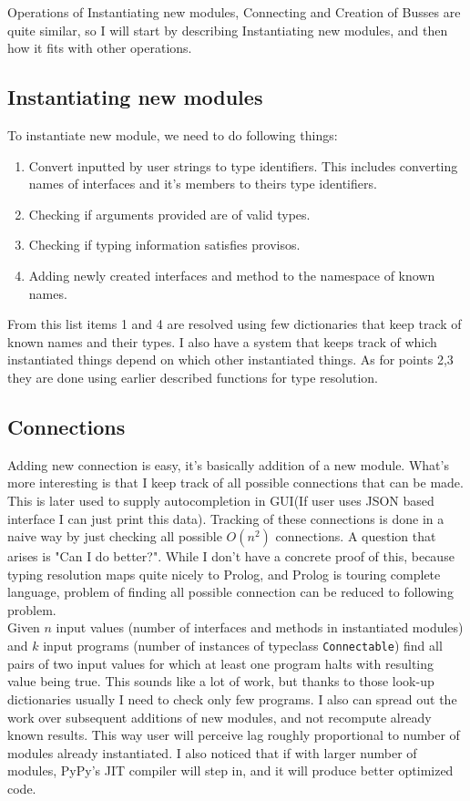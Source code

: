 \documentclass[12pt]{report}
\begin{document}
Operations of Instantiating new modules, Connecting and Creation of Busses are quite similar, so I will start by describing Instantiating new modules, and then how it fits with other operations.

\subsection{Instantiating new modules}
To instantiate new module, we need to do following things:
\begin{enumerate}
    \item Convert inputted by user strings to type identifiers. This includes converting names of interfaces and it's members to theirs type identifiers.
    \item Checking if arguments provided are of valid types.
    \item Checking if typing information satisfies provisos.
    \item Adding newly created interfaces and method to the namespace of known names.
\end{enumerate}
From this list items 1 and 4 are resolved using few dictionaries that keep track of known names and their types. I also have a system that keeps track of which instantiated things depend on which other instantiated things. As for points 2,3 they are done using earlier described functions for type resolution.

\subsection{Connections}
Adding new connection is easy, it's basically addition of a new module. What's more interesting is that I keep track of all possible connections that can be made. This is later used to supply autocompletion in GUI(If user uses JSON based interface I can just print this data). Tracking of these connections is done in a naive way by just checking all possible $O(n^2)$ connections. A question that arises is "Can I do better?". While I don't have a concrete proof of this, because typing resolution maps quite nicely to Prolog, and Prolog is touring complete language, problem of finding all possible connection can be reduced to following problem. \\ 
Given $n$ input values (number of interfaces and methods in instantiated modules) and $k$ input programs (number of instances of typeclass \verb!Connectable!) find all pairs of two input values for which at least one program halts with resulting value being true.
This sounds like a lot of work, but thanks to those look-up dictionaries usually I need to check only few programs. I also can spread out the work over subsequent additions of new modules, and not recompute already known results. This way user will perceive lag roughly proportional to number of modules already instantiated. I also noticed that if with larger number of modules, PyPy's JIT compiler will step in, and it will produce better optimized code.
\end{document}
